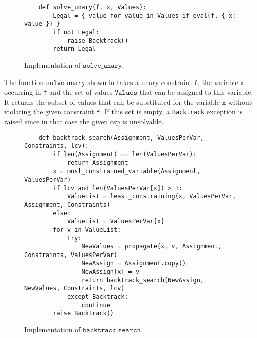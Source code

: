 \begin{figure}[!ht]
\centering
\begin{verbatim}
    def solve_unary(f, x, Values):
        Legal = { value for value in Values if eval(f, { x: value }) }
        if not Legal:
            raise Backtrack()
        return Legal
\end{verbatim}
\vspace*{-0.3cm}
\caption{Implementation of $\texttt{solve\_unary}$.}
\label{fig:Constraint-Propagation-Solver.ipynb:solve_unary}
\end{figure}

The function $\texttt{solve\_unary}$ shown in  takes a unary
constraint $\texttt{f}$, the variable $\texttt{x}$ occurring in \texttt{f} and the set of values $\texttt{Values}$ that can be assigned to this
variable.  It returns the subset of values that can be substituted for the variable $\texttt{x}$
without violating the given constraint $\texttt{f}$.  If this set is empty, a \texttt{Backtrack} exception is
raised since in that case the given \ac{csp} is unsolvable.


\begin{figure}[!ht]
\centering
\begin{verbatim}
    def backtrack_search(Assignment, ValuesPerVar, Constraints, lcv):
        if len(Assignment) == len(ValuesPerVar):
            return Assignment
        x = most_constrained_variable(Assignment, ValuesPerVar)
        if lcv and len(ValuesPerVar[x]) > 1:
            ValueList = least_constraining(x, ValuesPerVar, Assignment, Constraints)
        else:
            ValueList = ValuesPerVar[x]
        for v in ValueList: 
            try:
                NewValues = propagate(x, v, Assignment, Constraints, ValuesPerVar)
                NewAssign = Assignment.copy()
                NewAssign[x] = v
                return backtrack_search(NewAssign, NewValues, Constraints, lcv)
            except Backtrack:
                continue
        raise Backtrack()
\end{verbatim}
\vspace*{-0.3cm}
\caption{Implementation of $\texttt{backtrack\_search}$.}
\label{fig:Constraint-Propagation-Solver.ipynb:backtrack_search}
\end{figure}


